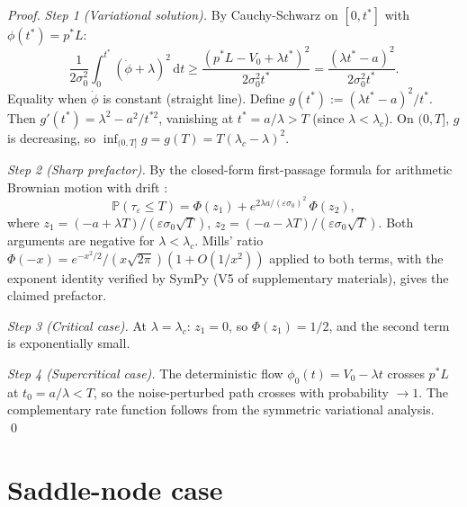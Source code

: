 \documentclass[11pt,a4paper]{article}
\theoremstyle{plain}
\theoremstyle{definition}
\renewcommand{\P}{\mathbb{P}}
\newcommand{\eps}{\varepsilon}
\renewcommand{\d}{\mathrm{d}}
\begin{document}
\begin{proof}
\textit{Step 1 (Variational solution).} By Cauchy-Schwarz on $[0, t^*]$ with $\phi(t^*) = p^*L$:
\begin{equation*}
\frac{1}{2\sigma_0^2}\int_0^{t^*}(\dot\phi + \lambda)^2\,\d t \geq \frac{(p^*L - V_0 + \lambda t^*)^2}{2\sigma_0^2 t^*} = \frac{(\lambda t^* - a)^2}{2\sigma_0^2 t^*}.
\end{equation*}
Equality when $\dot\phi$ is constant (straight line). Define $g(t^*) := (\lambda t^* - a)^2/t^*$. Then $g'(t^*) = \lambda^2 - a^2/t^{*2}$, vanishing at $t^* = a/\lambda > T$ (since $\lambda < \lambda_c$). On $(0, T]$, $g$ is decreasing, so $\inf_{(0,T]} g = g(T) = T(\lambda_c - \lambda)^2$.

\textit{Step 2 (Sharp prefactor).} By the closed-form first-passage formula for arithmetic Brownian motion with drift \cite[\S 2.5.2]{KaratzasShreve1991}:
\begin{equation*}
\P(\tau_\eps \leq T) = \Phi(z_1) + e^{2\lambda a/(\eps\sigma_0)^2}\,\Phi(z_2),
\end{equation*}
where $z_1 = (-a + \lambda T)/(\eps\sigma_0\sqrt T)$, $z_2 = (-a - \lambda T)/(\eps\sigma_0\sqrt T)$. Both arguments are negative for $\lambda < \lambda_c$. Mills' ratio $\Phi(-x) = e^{-x^2/2}/(x\sqrt{2\pi})(1 + O(1/x^2))$ applied to both terms, with the exponent identity verified by SymPy (V5 of supplementary materials), gives the claimed prefactor.

\textit{Step 3 (Critical case).} At $\lambda = \lambda_c$: $z_1 = 0$, so $\Phi(z_1) = 1/2$, and the second term is exponentially small.

\textit{Step 4 (Supercritical case).} The deterministic flow $\phi_0(t) = V_0 - \lambda t$ crosses $p^*L$ at $t_0 = a/\lambda < T$, so the noise-perturbed path crosses with probability $\to 1$. The complementary rate function follows from the symmetric variational analysis.
\qed
\end{proof}

\section{Saddle-node case}
\label{sec:saddle}
\end{document}
